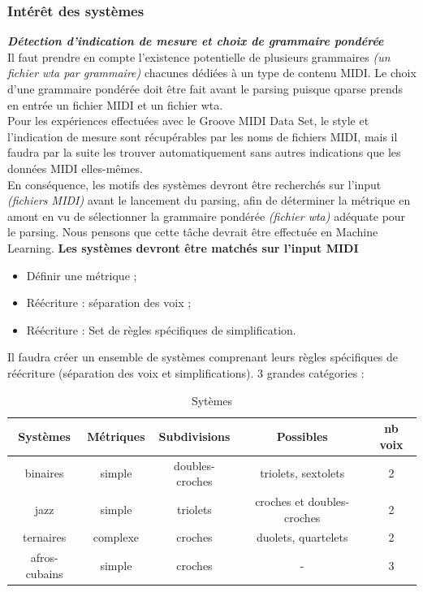 \subsubsection{Intérêt des systèmes}
\textit{\textbf{Détection d’indication de mesure et choix de grammaire pondérée}}\\
Il faut prendre en compte l’existence potentielle de plusieurs grammaires \textit{(un fichier wta par grammaire)} chacunes dédiées à un type de contenu MIDI. Le choix d’une grammaire pondérée doit être fait avant le parsing puisque qparse prends en entrée un fichier MIDI et un fichier wta.\\
Pour les expériences effectuées avec le Groove MIDI Data Set, le style et l’indication de mesure sont récupérables par les noms de fichiers MIDI, mais il faudra par la suite les trouver automatiquement sans autres indications que les données MIDI elles-mêmes.\\
En conséquence, les motifs des systèmes devront être recherchés sur l’input \textit{(fichiers MIDI)} avant le lancement du parsing, afin de déterminer la métrique en amont en vu de sélectionner la grammaire pondérée \textit{(fichier wta)} adéquate pour le parsing. Nous pensons que cette tâche devrait être effectuée en Machine Learning.
\textbf{Les systèmes devront être matchés sur l’input MIDI}
\begin{itemize}
	\item Définir une métrique ;
	\item Réécriture : séparation des voix ;
	\item Réécriture : Set de règles spécifiques de simplification.
\end{itemize}

Il faudra créer un ensemble de systèmes comprenant leurs règles spécifiques de réécriture (séparation des voix et simplifications).
3 grandes catégories :
\begin{table}[h]
	\centering
	\begin{tabular}{|c|c|c|c|c|} \hline
		Systèmes & Métriques & Subdivisions & Possibles & nb voix \\ \hline
		binaires & simple & doubles-croches & triolets, sextolets & 2 \\
		jazz & simple & triolets & croches et doubles-croches & 2 \\
		ternaires & complexe & croches & duolets, quartelets & 2 \\
		afros-cubains & simple & croches & - & 3 \\ \hline
	\end{tabular}
	\caption{Sytèmes}
\end{table}

